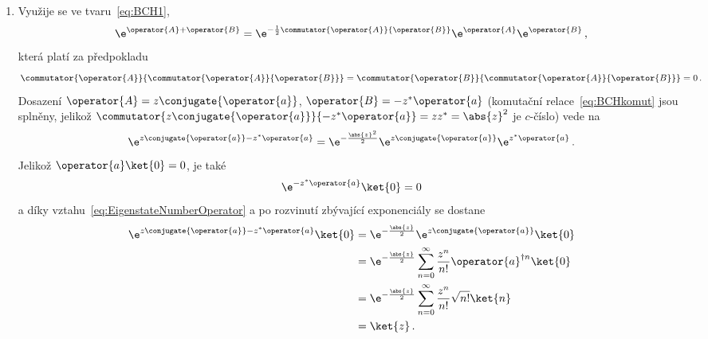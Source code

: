 \begin{solution}
\begin{enumerate}
		\item
			Využije se  ve tvaru~\eqref{eq:BCH1},
			\begin{equation}
				\e^{\operator{A}+\operator{B}}=\e^{-\frac{1}{2}\commutator{\operator{A}}{\operator{B}}}\e^{\operator{A}}\e^{\operator{B}}\,,
			\end{equation}
			která platí za předpokladu
			\begin{equation}
				\label{eq:BCHkomut}
				\commutator{\operator{A}}{\commutator{\operator{A}}{\operator{B}}}=\commutator{\operator{B}}{\commutator{\operator{A}}{\operator{B}}}=0\,.
			\end{equation}
			Dosazení $\operator{A}=z\conjugate{\operator{a}}$, $\operator{B}=-z^{*}\operator{a}$
			(komutační relace~\eqref{eq:BCHkomut} jsou splněny, jelikož $\commutator{z\conjugate{\operator{a}}}{-z^{*}\operator{a}}=zz^{*}=\abs{z}^{2}$ je $c$-číslo) vede na
			\begin{equation}
				\e^{z\conjugate{\operator{a}}-z^{*}\operator{a}}
					=\e^{-\frac{\abs{z}^{2}}{2}}\e^{z\conjugate{\operator{a}}}\e^{z^{*}\operator{a}}\,.
			\end{equation}
			Jelikož $\operator{a}\ket{0}=0$, je také
			\begin{equation}
				\e^{-z^{*}\operator{a}}\ket{0}=0
			\end{equation}
			a díky vztahu~\eqref{eq:EigenstateNumberOperator} a po rozvinutí zbývající exponenciály se dostane
			\begin{align}
				\e^{z\conjugate{\operator{a}}-z^{*}\operator{a}}\ket{0}
					&=\e^{-\frac{\abs{z}}{2}}\e^{z\conjugate{\operator{a}}}\ket{0}\nonumber\\
					&=\e^{-\frac{\abs{z}}{2}}\sum_{n=0}^{\infty}
						\frac{z^{n}}{n!}\operator{a}^{\dagger n}\ket{0}\nonumber\\
					&=\e^{-\frac{\abs{z}}{2}}\sum_{n=0}^{\infty}
						\frac{z^{n}}{n!}\sqrt{n!}\ket{n}\nonumber\\
					&=\ket{z}\,.
			\end{align}			
	\end{enumerate}
\end{solution}
